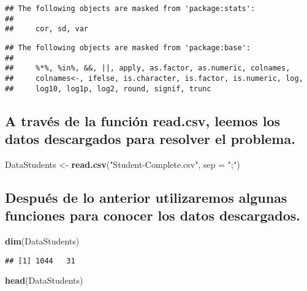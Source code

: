 \documentclass[
]{article}
\newenvironment{Shaded}{\begin{snugshade}}{\end{snugshade}}
\newcommand{\DataTypeTok}[1]{\textcolor[rgb]{0.13,0.29,0.53}{#1}}
\newcommand{\KeywordTok}[1]{\textcolor[rgb]{0.13,0.29,0.53}{\textbf{#1}}}
\newcommand{\NormalTok}[1]{#1}
\newcommand{\StringTok}[1]{\textcolor[rgb]{0.31,0.60,0.02}{#1}}
\begin{document}
\begin{verbatim}
## The following objects are masked from 'package:stats':
## 
##     cor, sd, var
\end{verbatim}

\begin{verbatim}
## The following objects are masked from 'package:base':
## 
##     %*%, %in%, &&, ||, apply, as.factor, as.numeric, colnames,
##     colnames<-, ifelse, is.character, is.factor, is.numeric, log,
##     log10, log1p, log2, round, signif, trunc
\end{verbatim}

\hypertarget{a-travuxe9s-de-la-funciuxf3n-read.csv-leemos-los-datos-descargados-para-resolver-el-problema.}{%
\subsection{A través de la función read.csv, leemos los datos
descargados para resolver el
problema.}\label{a-travuxe9s-de-la-funciuxf3n-read.csv-leemos-los-datos-descargados-para-resolver-el-problema.}}

\begin{Shaded}
\begin{Highlighting}[]
\NormalTok{DataStudents <-}\StringTok{ }\KeywordTok{read.csv}\NormalTok{(}\StringTok{"Student-Complete.csv"}\NormalTok{, }\DataTypeTok{sep =} \StringTok{";"}\NormalTok{)}
\end{Highlighting}
\end{Shaded}

\hypertarget{despuuxe9s-de-lo-anterior-utilizaremos-algunas-funciones-para-conocer-los-datos-descargados.}{%
\subsection{Después de lo anterior utilizaremos algunas funciones para
conocer los datos
descargados.}\label{despuuxe9s-de-lo-anterior-utilizaremos-algunas-funciones-para-conocer-los-datos-descargados.}}

\begin{Shaded}
\begin{Highlighting}[]
\KeywordTok{dim}\NormalTok{(DataStudents)}
\end{Highlighting}
\end{Shaded}

\begin{verbatim}
## [1] 1044   31
\end{verbatim}

\begin{Shaded}
\begin{Highlighting}[]
\KeywordTok{head}\NormalTok{(DataStudents)}
\end{Highlighting}
\end{Shaded}
\end{document}
